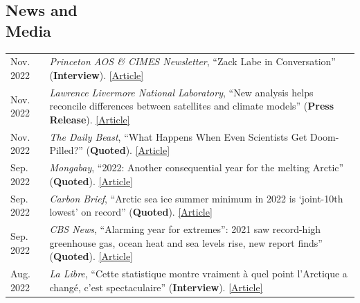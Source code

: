 \documentclass[margin,line,palatino,courier,10pt]{res}
\begin{document}
\begin{resume}
\section{\sc \textcolor{Cerulean}{\large{\textbf{News and\\ Media}}}}
\vspace*{0.04in}
\begin{tabular}{@{}p{0.9in}p{4in}}
Nov. 2022 & \textit{Princeton AOS \& CIMES Newsletter}, ``Zack Labe in Conversation'' (\textbf{Interview}). \href{https://aos.princeton.edu/sites/g/files/toruqf1176/files/documents/AOS\%20\%26\%20CIMES\%20Newsletter\%20Fall\%202022.pdf}{[Article]}\\
Nov. 2022 & \textit{Lawrence Livermore National Laboratory}, ``New analysis helps reconcile differences between satellites and climate models'' (\textbf{Press Release}). \href{https://www.llnl.gov/news/new-analysis-helps-reconcile-differences-between-satellites-climate-models}{[Article]}\\
Nov. 2022 & \textit{The Daily Beast}, ``What Happens When Even Scientists Get Doom-Pilled?'' (\textbf{Quoted}). \href{https://www.thedailybeast.com/how-climate-change-doomerism-is-even-taking-over-scientists}{[Article]}\\
Sep. 2022 & \textit{Mongabay}, ``2022: Another consequential year for the melting Arctic'' (\textbf{Quoted}). \href{https://news.mongabay.com/2022/09/2022-another-consequential-year-for-the-melting-arctic/}{[Article]}\\
Sep. 2022 & \textit{Carbon Brief}, ``Arctic sea ice summer minimum in 2022 is `joint-10th lowest' on record'' (\textbf{Quoted}). \href{https://www.carbonbrief.org/arctic-sea-ice-summer-minimum-in-2022-is-joint-10th-lowest-on-record/}{[Article]}\\
Sep. 2022 & \textit{CBS News}, ``Alarming year for extremes'': 2021 saw record-high greenhouse gas, ocean heat and sea levels rise, new report finds'' (\textbf{Quoted}). \href{https://www.cbsnews.com/news/2021-record-high-greenhouse-gases-ocean-heat-and-sea-level-rise-extreme-heat/}{[Article]}\\
Aug. 2022 & \textit{La Libre}, ``Cette statistique montre vraiment \`{a} quel point l'Arctique a chang\'{e}, c'est spectaculaire'' (\textbf{Interview}). \href{https://www.lalibre.be/planete/environnement/2022/08/17/cette-statistique-montre-vraiment-a-quel-point-larctique-a-change-cest-spectaculaire-FGU5ABQZB5F6XINIL5ZBBB3CXM/}{[Article]}\\
\end{tabular}

\end{resume}
\end{document}
